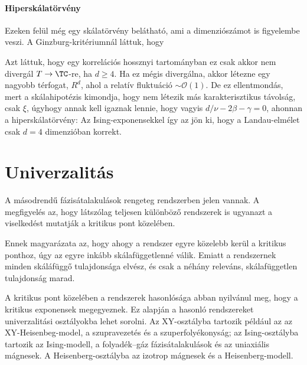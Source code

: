    \paragraph{Hiperskálatörvény}
    
    Ezeken felül még egy skálatörvény belátható, ami a dimenziószámot is figyelembe veszi.
   A Ginzburg-kritériumnál láttuk, hogy 
    
    Azt láttuk, hogy egy korrelációs hossznyi tartományban ez csak akkor nem divergál $T\to\TC$-re, ha $d\ge 4$.
   Ha ez mégis divergálna, akkor létezne egy nagyobb térfogat, $R^d$, ahol a relatív fluktuáció $\sim\mathcal{O}(1)$.
   De ez ellentmondás, mert a skálahipotézis kimondja, hogy nem létezik más karakterisztikus távolság, csak $\xi$, úgyhogy annak kell igaznak lennie, hogy 
    vagyis $d/\nu-2\beta-\gamma=0$, ahonnan a hiperskálatörvény:
    Az Ising-exponensekkel így az jön ki, hogy a Landau-elmélet csak $d=4$ dimenzióban korrekt.

 \section{Univerzalitás}\label{ss:B10-univerzalitas}
  
  A másodrendű fázisátalakulások rengeteg rendszerben jelen vannak.
   A megfigyelés az, hogy látszólag teljesen különböző rendszerek is ugyanazt a viselkedést mutatják a kritikus pont közelében. 
  
  Ennek magyarázata az, hogy ahogy a rendszer egyre közelebb kerül a kritikus ponthoz, úgy az egyre inkább skálafüggetlenné válik.
   Emiatt a rendszernek minden skáláfüggő tulajdonsága elvész, és csak a néhány releváns, skálafüggetlen tulajdonság marad. 
  
  A kritikus pont közelében a rendszerek hasonlósága abban nyilvánul meg, hogy a kritikus exponensek megegyeznek.
   Ez alapján a hasonló rendszereket univerzalitási osztályokba lehet sorolni.
   Az XY-osztályba tartozik például az az XY-Heisenbeg-model, a szupravezetés és a szuperfolyékonyság; az Ising-osztályba tartozik az Ising-modell, a folyadék--gáz fázisátalakulások és az uniaxiális mágnesek.
   A Heisenberg-osztályba az izotrop mágnesek és a Heisenberg-modell. 
